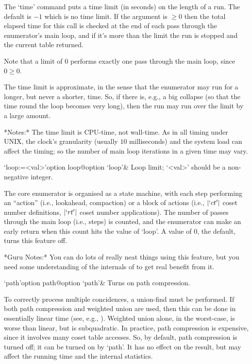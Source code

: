 The `time' command  puts a time limit (in seconds) on  the length of a
run. The default is $-1$  which is no  time limit. If the  argument is
$\ge0$ then the total elapsed time for this call is checked at the end
of each pass through the enumerator's main loop, and if it's more than
the limit the run is stopped and the current table returned.

Note that a limit of $0$ performs exactly one pass  through  the  main
loop, since $0 \ge 0$.

The time  limit is approximate, in  the sense that  the enumerator may
run for a longer, but never a shorter, time.  So, if there is, e.g., a
big collapse (so that the time round the loop becomes very long), then
the run may run over the limit by a large amount.

*Notes:*
The time limit is CPU-time, not wall-time.  As  in  all  timing  under
UNIX, the clock's granularity  (usually  $10$  milliseconds)  and  the
system load can  affect  the  timing;  so  the  number  of  main  loop
iterations in a given time may vary.

\>`loop:=<val>'{option loop}@{option `loop'}&
Loop limit; `<val>' should be a non-negative integer.

The core enumerator is organised as a state machine,  with  each  step
performing an ``action'' (i.e., lookahead, compaction) or a  block  of
actions (i.e.,  $|`ct'|$  coset  number  definitions,  $|`rt'|$  coset
number applications). The number  of  passes  through  the  main  loop
(i.e., steps) is counted, and the enumerator can make an early  return
when this count hits the value of `loop'. A value of $0$, the default,
turns this feature off.

*Guru Notes:*
You can do lots of really neat things using this feature, but you need
some understanding of the internals of {\ACE} to get real benefit from
it.

\>`path'{option path}@{option `path'}&
Turns on path compression.

To correctly  process  multiple  concidences,  a  union-find  must  be
performed. If both path compression and weighted union are used,  then
this can be done in essentially linear time (see, e.g., \cite{CLR90}).
Weighted union alone, in the worst-case, is worse than linear, but  is
subquadratic. In practice, path compression  is  expensive,  since  it
involves many coset table accesses. So, by default,  path  compression
is turned off; it can be turned on by `path'. It has no effect on  the
result, but may affect the running time and the internal statistics.

